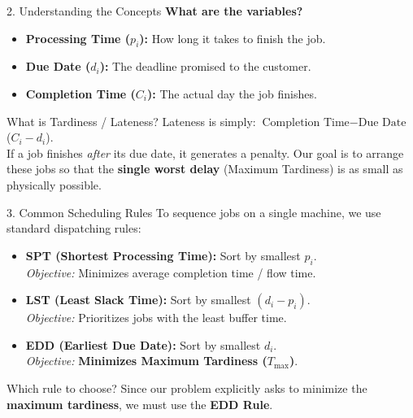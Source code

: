 \documentclass[12pt, aspectratio=169]{beamer}
\newcommand{\res}[1]{\textcolor{highlightcol}{\textbf{#1}}}
\begin{document}
\begin{frame}{2. Understanding the Concepts}
    \textbf{What are the variables?}
    \begin{itemize}
        \item \textbf{Processing Time ($p_i$):} How long it takes to finish the job.
        \item \textbf{Due Date ($d_i$):} The deadline promised to the customer.
        \item \textbf{Completion Time ($C_i$):} The actual day the job finishes.
    \end{itemize}
    
    \vspace{0.3cm}
    \begin{block}{What is Tardiness / Lateness?}
        Lateness is simply: $\text{Completion Time} - \text{Due Date}$ \quad ($C_i - d_i$). \\
        \vspace{0.1cm}
        If a job finishes \textit{after} its due date, it generates a penalty. Our goal is to arrange these jobs so that the \textbf{single worst delay} (Maximum Tardiness) is as small as physically possible.
    \end{block}
\end{frame}

\begin{frame}{3. Common Scheduling Rules}
    To sequence jobs on a single machine, we use standard dispatching rules:
    
    \vspace{0.3cm}
    \begin{itemize}
        \item \textbf{SPT (Shortest Processing Time):} Sort by smallest $p_i$. \\
        \textit{Objective:} Minimizes average completion time / flow time.
        \vspace{0.1cm}
        \item \textbf{LST (Least Slack Time):} Sort by smallest $(d_i - p_i)$. \\
        \textit{Objective:} Prioritizes jobs with the least buffer time.
        \vspace{0.1cm}
        \item \textbf{EDD (Earliest Due Date):} Sort by smallest $d_i$. \\
        \textit{Objective:} \res{Minimizes Maximum Tardiness ($T_{\max}$)}.
    \end{itemize}
    
    \vspace{0.3cm}
    \begin{block}{Which rule to choose?}
        Since our problem explicitly asks to minimize the \textbf{maximum tardiness}, we must use the \textbf{EDD Rule}.
    \end{block}
\end{frame}
\end{document}
